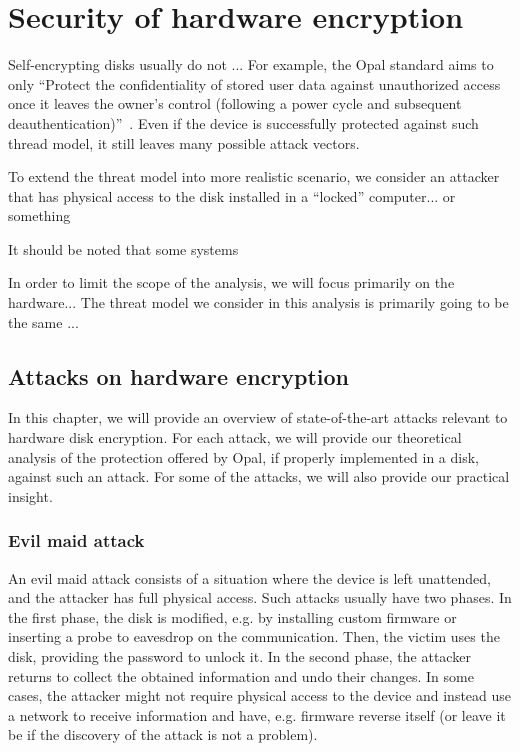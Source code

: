 \chapter{Security of hardware encryption}

Self-encrypting disks usually do not ...
For example, the Opal standard aims to only \enquote{Protect the confidentiality of stored user data against unauthorized access once it leaves the owner’s control (following a power cycle and subsequent deauthentication)}~\cite{tcg-opal2}.
Even if the device is successfully protected against such thread model, it still leaves many possible attack vectors.

To extend the threat model into more realistic scenario, we consider an attacker that has physical access to the disk installed in a ``locked'' computer... or something

It should be noted that some systems 

In order to limit the scope of the analysis, we will focus primarily on the hardware...
The threat model we consider in this analysis is primarily going to be the same ...



\section{Attacks on hardware encryption}

In this chapter, we will provide an overview of state-of-the-art attacks relevant to hardware disk encryption. For each attack, we will provide our theoretical analysis of the protection offered by Opal, if properly implemented in a disk, against such an attack. For some of the attacks, we will also provide our practical insight.


\subsection{Evil maid attack}

An evil maid attack consists of a situation where the device is left unattended, and the attacker has full physical access. Such attacks usually have two phases. In the first phase, the disk is modified, e.g. by installing custom firmware or inserting a probe to eavesdrop on the communication. Then, the victim uses the disk, providing the password to unlock it. In the second phase, the attacker returns to collect the obtained information and undo their changes. In some cases, the attacker might not require physical access to the device and instead use a network to receive information and have, e.g. firmware reverse itself (or leave it be if the discovery of the attack is not a problem).


